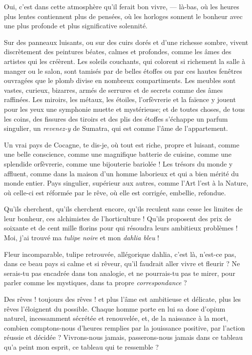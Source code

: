 \quebra

Oui, c’est dans cette atmosphère qu’il
ferait bon vivre, --- là{}-bas, où les heures plus lentes contiennent
plus de pensées, où les horloges sonnent le bonheur avec une plus
profonde et plus significative solennité.

Sur des panneaux luisants, ou sur des cuirs dorés et
d’une richesse sombre, vivent discrètement des
peintures béates, calmes et profondes, comme les âmes des artistes qui
les créèrent. Les soleils couchants, qui colorent si richement la salle
à manger ou le salon, sont tamisés par de belles étoffes ou par ces
hautes fenêtres ouvragées que le plomb divise en nombreux
compartiments. Les meubles sont vastes, curieux, bizarres, armés de
serrures et de secrets comme des âmes raffinées. Les miroirs, les
métaux, les étoiles, l’orfèvrerie et la faïence y
jouent pour les yeux une symphonie muette et mystérieuse; et de toutes
choses, de tous les coins, des fissures des tiroirs et des plis des
étoffes s’échappe un parfum singulier, un \textit{revenez{}-y}
de Sumatra, qui est comme l’âme de
l’appartement.

Un vrai pays de Cocagne, te dis{}-je, où tout est riche, propre et
luisant, comme une belle conscience, comme une magnifique batterie de
cuisine, comme une splendide orfèvrerie, comme une bijouterie bariolée
! Les trésors du monde y affluent, comme dans la maison
d’un homme laborieux et qui a bien mérité du monde
entier. Pays singulier, supérieur aux autres, comme
l’Art l’est à la Nature, où
celle{}-ci est réformée par le rêve, où elle est corrigée, embellie,
refondue.

Qu’ils cherchent, qu’ils cherchent
encore, qu’ils reculent sans cesse les limites de leur
bonheur, ces alchimistes de l’horticulture !
Qu’ils proposent des prix de soixante et de cent mille
florins pour qui résoudra leurs ambitieux problèmes ! Moi,
j’ai trouvé ma \textit{tulipe noire} et mon \textit{dahlia bleu} !

Fleur incomparable, tulipe retrouvée, allégorique dahlia,
c’est là, n’est{}-ce pas, dans ce
beau pays si calme et si rêveur, qu’il faudrait aller
vivre et fleurir ? Ne serais{}-tu pas encadrée dans ton analogie, et ne
pourrais{}-tu pas te mirer, pour parler comme les mystiques, dans ta
propre \textit{correspondance} ?

Des rêves ! toujours des rêves ! et plus l’âme est
ambitieuse et délicate, plus les rêves l’éloignent du
possible. Chaque homme porte en lui sa dose d’opium
naturel, incessamment sécrétée et renouvelée, et, de la naissance à la
mort, combien comptons{}-nous d’heures remplies par la
jouissance positive, par l’action réussie et décidée ?
Vivrons{}-nous jamais, passerons{}-nous jamais dans ce tableau
qu’a peint mon esprit, ce tableau qui te ressemble ?

